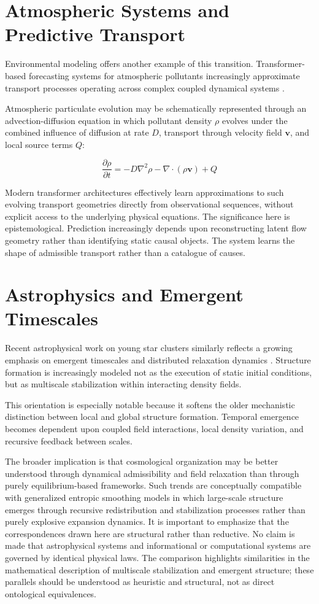 \documentclass[12pt,a4paper]{article}
\begin{document}
\section{Atmospheric Systems and Predictive Transport}

Environmental modeling offers another example of this transition. Transformer-based
forecasting systems for atmospheric pollutants increasingly approximate transport
processes operating across complex coupled dynamical systems \cite{PM10Transformer}.

Atmospheric particulate evolution may be schematically represented through an
advection-diffusion equation in which pollutant density $\rho$ evolves under the
combined influence of diffusion at rate $D$, transport through velocity field
$\mathbf{v}$, and local source terms $Q$:

\[
\frac{\partial \rho}{\partial t}
=
-D\nabla^2 \rho
-
\nabla \cdot (\rho \mathbf{v})
+
Q
\]

Modern transformer architectures effectively learn approximations to such evolving
transport geometries directly from observational sequences, without explicit access
to the underlying physical equations. The significance here is epistemological.
Prediction increasingly depends upon reconstructing latent flow geometry rather than
identifying static causal objects. The system learns the shape of admissible transport
rather than a catalogue of causes.

\section{Astrophysics and Emergent Timescales}

Recent astrophysical work on young star clusters similarly reflects a growing emphasis
on emergent timescales and distributed relaxation dynamics \cite{StarClusters}.
Structure formation is increasingly modeled not as the execution of static initial
conditions, but as multiscale stabilization within interacting density fields.

This orientation is especially notable because it softens the older mechanistic
distinction between local and global structure formation. Temporal emergence becomes
dependent upon coupled field interactions, local density variation, and recursive
feedback between scales.

The broader implication is that cosmological organization may be better understood
through dynamical admissibility and field relaxation than through purely
equilibrium-based frameworks. Such trends are conceptually compatible with generalized
entropic smoothing models in which large-scale structure emerges through recursive
redistribution and stabilization processes rather than purely explosive expansion
dynamics. It is important to emphasize that the correspondences drawn here are
structural rather than reductive. No claim is made that astrophysical systems and
informational or computational systems are governed by identical physical laws. The
comparison highlights similarities in the mathematical description of multiscale
stabilization and emergent structure; these parallels should be understood as
heuristic and structural, not as direct ontological equivalences.
\end{document}
